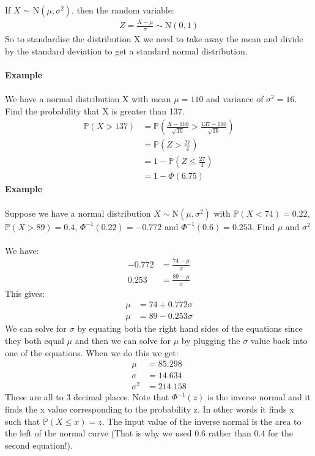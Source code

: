 \documentclass[,oneside]{article}
\begin{document}
\begin{enumerate}
If $X$ $\sim$ N$(\mu,\sigma^2)$, then the random variable:
\begin{align*}
Z = \frac{X-\mu}{\sigma} \sim \text{N}(0,1)
\end{align*}
So to standardise the distribution X we need to take away the mean and divide by the standard deviation to get a standard normal distribution.\\ \\
\textbf{Example}\\ \\
We have a normal distribution X with mean $\mu = 110$ and variance of $\sigma^2=16$. Find the probability that X is greater than 137.
\begin{align*}
\mathbb{P}(X > 137)& = \mathbb{P} \left (\frac{X-110}{\sqrt{16}} > \frac{137-110}{\sqrt{16}}\right )\\
&= \mathbb{P}\left (Z > \frac{27}{4} \right )\\
&= 1-\mathbb{P}\left (Z \leq \frac{27}{4}\right )\\
&= 1-\Phi(6.75)
\end{align*}
\textbf{Example}\\ \\
Suppose we have a normal distribution $X \sim \text{N}(\mu,\sigma^2)$ with $\mathbb{P}(X < 74) = 0.22$, $\mathbb{P}(X > 89) = 0.4$, $\Phi^{-1}(0.22)=-0.772$ and $\Phi^{-1}(0.6)=0.253$. Find $\mu$ and $\sigma^2$\\ \\
We have:
\begin{align*}
-0.772&=\frac{74-\mu}{\sigma}\\
0.253&=\frac{89-\mu}{\sigma}
\end{align*}
This gives:
\begin{align*}
\mu &= 74 + 0.772\sigma \\
\mu &= 89 - 0.253\sigma
\end{align*} 
We can solve for $\sigma$ by equating both the right hand sides of the equations since they both equal $\mu$ and then we can solve for $\mu$ by plugging the $\sigma$ value back into one of the equations. When we do this we get:
\begin{align*}
\mu &= 85.298\\
\sigma &= 14.634\\
\sigma^2 &=  214.158
\end{align*}
These are all to 3 decimal places. Note that $\Phi^{-1}(z)$ is the inverse normal and it finds the x value corresponding to the probability z. In other words it finds x such that $\mathbb{P}(X \leq x) = z$. The input value of the inverse normal is the area to the left of the normal curve (That is why we used 0.6 rather than 0.4 for the second equation!).\\ \\

\end{enumerate}
\end{document}
